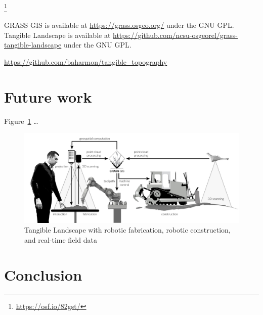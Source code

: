 \documentclass[prodmode,acmtochi]{acmsmall} %
\begin{document}
\footnote{\url{https://osf.io/82gst/}}

GRASS GIS is available at
\url{https://grass.osgeo.org/} 
under the GNU GPL. 
%
Tangible Landscape is available at
\url{https://github.com/ncsu-osgeorel/grass-tangible-landscape} 
under the GNU GPL.  %

\url{https://github.com/baharmon/tangible_topography}

\section{Future work}






Figure~\ref{fig:system_schema_land} \ldots 

\begin{figure}%
\begin{center}
\includegraphics[width=\textwidth]{images/system_schema_land.pdf}
\caption{Tangible Landscape with robotic fabrication, robotic construction, and real-time field data}
\label{fig:system_schema_land}
\end{center}
\end{figure}

\section{Conclusion}

\end{document}
